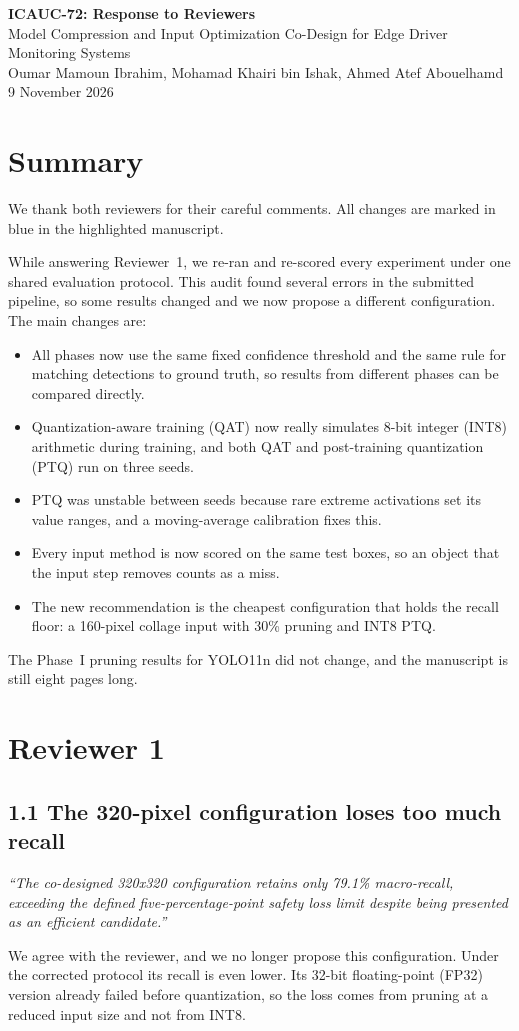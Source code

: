\documentclass[10pt]{article}
\newcommand{\comment}[2]{\subsection*{#1}\textit{#2}\par}
\begin{document}
{\Large\bfseries ICAUC-72: Response to Reviewers}\\[3pt]
Model Compression and Input Optimization Co-Design for Edge Driver Monitoring Systems\\
Oumar Mamoun Ibrahim, Mohamad Khairi bin Ishak, Ahmed Atef Abouelhamd \hfill 9 November 2026

\section*{Summary}
We thank both reviewers for their careful comments. All changes are marked in blue in the highlighted manuscript.

While answering Reviewer~1, we re-ran and re-scored every experiment under one shared evaluation protocol. This audit found several errors in the submitted pipeline, so some results changed and we now propose a different configuration. The main changes are:
\begin{itemize}
\item All phases now use the same fixed confidence threshold and the same rule for matching detections to ground truth, so results from different phases can be compared directly.
\item Quantization-aware training (QAT) now really simulates 8-bit integer (INT8) arithmetic during training, and both QAT and post-training quantization (PTQ) run on three seeds.
\item PTQ was unstable between seeds because rare extreme activations set its value ranges, and a moving-average calibration fixes this.
\item Every input method is now scored on the same test boxes, so an object that the input step removes counts as a miss.
\item The new recommendation is the cheapest configuration that holds the recall floor: a 160-pixel collage input with 30\% pruning and INT8 PTQ.
\end{itemize}
The Phase~I pruning results for YOLO11n did not change, and the manuscript is still eight pages long.

\section*{Reviewer 1}

\comment{1.1 The 320-pixel configuration loses too much recall}{``The co-designed 320x320 configuration retains only 79.1\% macro-recall, exceeding the defined five-percentage-point safety loss limit despite being presented as an efficient candidate.''}
We agree with the reviewer, and we no longer propose this configuration. Under the corrected protocol its recall is even lower. Its 32-bit floating-point (FP32) version already failed before quantization, so the loss comes from pruning at a reduced input size and not from INT8.
\end{document}
